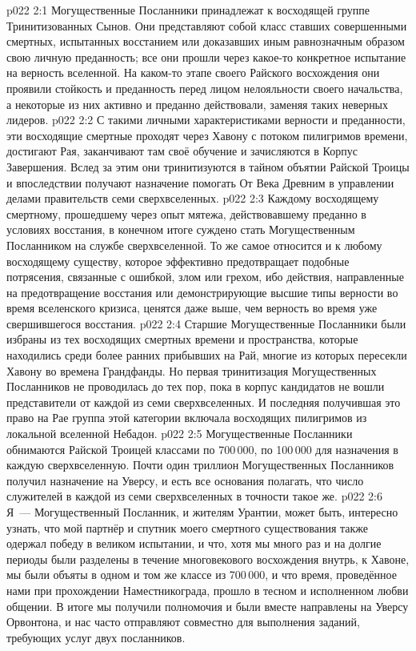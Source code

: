 \vs p022 2:1 Могущественные Посланники принадлежат к восходящей группе Тринитизованных Сынов. Они представляют собой класс ставших совершенными смертных, испытанных восстанием или доказавших иным равнозначным образом свою личную преданность; все они прошли через какое\hyp{}то конкретное испытание на верность вселенной. На каком\hyp{}то этапе своего Райского восхождения они проявили стойкость и преданность перед лицом нелояльности своего начальства, а некоторые из них активно и преданно действовали, заменяя таких неверных лидеров.
\vs p022 2:2 С такими личными характеристиками верности и преданности, эти восходящие смертные проходят через Хавону с потоком пилигримов времени, достигают Рая, заканчивают там своё обучение и зачисляются в Корпус Завершения. Вслед за этим они тринитизуются в тайном объятии Райской Троицы и впоследствии получают назначение помогать От Века Древним в управлении делами правительств семи сверхвселенных.
\vs p022 2:3 Каждому восходящему смертному, прошедшему через опыт мятежа, действовавшему преданно в условиях восстания, в конечном итоге суждено стать Могущественным Посланником на службе сверхвселенной. То же самое относится и к любому восходящему существу, которое эффективно предотвращает подобные потрясения, связанные с ошибкой, злом или грехом, ибо действия, направленные на предотвращение восстания или демонстрирующие высшие типы верности во время вселенского кризиса, ценятся даже выше, чем верность во время уже свершившегося восстания.
\vs p022 2:4 Старшие Могущественные Посланники были избраны из тех восходящих смертных времени и пространства, которые находились среди более ранних прибывших на Рай, многие из которых пересекли Хавону во времена Грандфанды. Но первая тринитизация Могущественных Посланников не проводилась до тех пор, пока в корпус кандидатов не вошли представители от каждой из семи сверхвселенных. И последняя получившая это право на Рае группа этой категории включала восходящих пилигримов из локальной вселенной Небадон.
\vs p022 2:5 Могущественные Посланники обнимаются Райской Троицей классами по 700\,000, по 100\,000 для назначения в каждую сверхвселенную. Почти один триллион Могущественных Посланников получил назначение на Уверсу, и есть все основания полагать, что число служителей в каждой из семи сверхвселенных в точности такое же.
\vs p022 2:6 \pc Я~--- Могущественный Посланник, и жителям Урантии, может быть, интересно узнать, что мой партнёр и спутник моего смертного существования также одержал победу в великом испытании, и что, хотя мы много раз и на долгие периоды были разделены в течение многовекового восхождения внутрь, к Хавоне, мы были объяты в одном и том же классе из 700\,000, и что время, проведённое нами при прохождении Наместникограда, прошло в тесном и исполненном любви общении. В итоге мы получили полномочия и были вместе направлены на Уверсу Орвонтона, и нас часто отправляют совместно для выполнения заданий, требующих услуг двух посланников.
